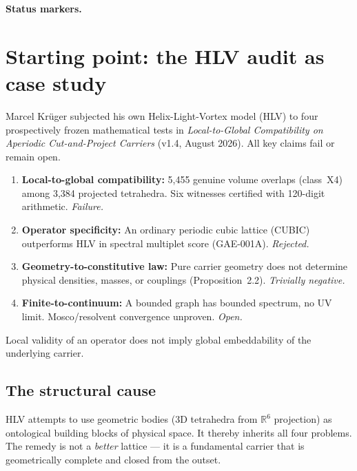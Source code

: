 \medskip\noindent\textbf{Status markers.}


\section{Starting point: the HLV audit as case study}
\label{sec:hlv}

Marcel Krüger subjected his own Helix-Light-Vortex model (HLV) to
four prospectively frozen mathematical tests in \emph{Local-to-Global
Compatibility on Aperiodic Cut-and-Project Carriers} (v1.4,
August 2026). All key claims fail or remain open.

\begin{enumerate}
  \item \textbf{Local-to-global compatibility:}
    5,455 genuine volume overlaps (class~X4) among 3,384 projected
    tetrahedra. Six witnesses certified with 120-digit arithmetic.
    \emph{Failure.} \E
  \item \textbf{Operator specificity:}
    An ordinary periodic cubic lattice (CUBIC) outperforms HLV in
    spectral multiplet score (GAE-001A). \emph{Rejected.} \E
  \item \textbf{Geometry-to-constitutive law:}
    Pure carrier geometry does not determine physical densities,
    masses, or couplings (Proposition~2.2). \emph{Trivially negative.} \E
  \item \textbf{Finite-to-continuum:}
    A bounded graph has bounded spectrum, no UV limit.
    Mosco/resolvent convergence unproven. \emph{Open.} \E
\end{enumerate}

\begin{tcolorbox}[warnbox,title={Corollary (Krüger 4.5) \E}]
  Local validity of an operator does not imply global embeddability
  of the underlying carrier.
\end{tcolorbox}

\subsection{The structural cause}

HLV attempts to use geometric bodies (3D tetrahedra from
$\mathbb{R}^6$ projection) as ontological building blocks of
physical space. It thereby inherits all four problems.
The remedy is not a \emph{better} lattice — it is a fundamental
carrier that is geometrically complete and closed from the outset.

